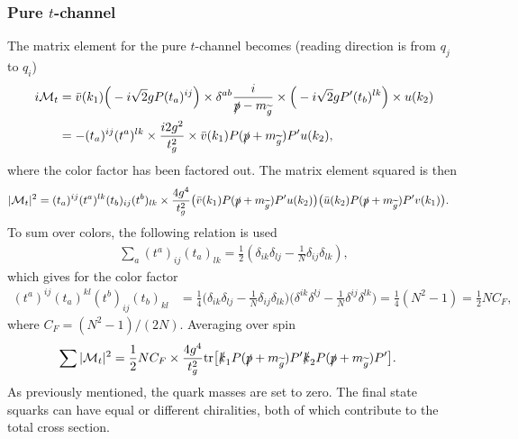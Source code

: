 \documentclass[twoside,english]{uiofysmaster}
\begin{document}
{\subsubsection{Pure $t$-channel}

The matrix element for the pure $t$-channel becomes (reading direction is from $q_j$ to $q_i$)
\begin{align*}
i \mathcal{M}_t &= \bar{v} (k_1) \Big( -i \sqrt{2} g P (t_a)^{ij}\Big) \times \delta^{ab} \frac{i}{\slashed{p} - m_{\widetilde{g}}} \times \Big( -i \sqrt{2} gP'(t_b)^{lk} \Big) \times u(k_2)\\
&= - (t_a)^{ij}(t^a)^{lk} \times \frac{i 2 g^2}{t_g^2} \times  \bar{v} (k_1)  P (\slashed{p} + m_{\widetilde{g}}) P' u(k_2) ,
\end{align*}
where the color factor has been factored out. The matrix element squared is then
\begin{align*}
|\mathcal{M}_t|^2 &=  (t_a)^{ij} (t^a)^{lk} (t_b)_{ij} (t^b)_{lk} \times \frac{4 g^4}{t_g^2}
\big( \bar{v} (k_1)  P (\slashed{p} + m_{\widetilde{g}}) P' u(k_2) \big)
\big( \bar{u} (k_2)  P (\slashed{p} + m_{\widetilde{g}}) P' v(k_1) \big).
\end{align*}
To sum over colors, the following relation is used \cite{ellis2003qcd}
\begin{align}
\sum_a (t^a)_{ij} (t_a)_{lk} = \frac{1}{2} (\delta_{ik} \delta_{lj} - \frac{1}{N} \delta_{ij} \delta_{lk}),
\end{align}
which gives for the color factor
\begin{align*}
(t^a)^{ij}(t_a)^{kl}(t^b)_{ij}(t_b)_{kl} &= \frac{1}{4} 
\big(\delta_{ik} \delta_{lj} - \frac{1}{N} \delta_{ij} \delta_{lk} \big)
\big(\delta^{ik} \delta^{lj} - \frac{1}{N} \delta^{ij} \delta^{lk} \big) = \frac{1}{4} (N^2 - 1) = \frac{1}{2}NC_F,
\end{align*}
where $C_F = (N^2 - 1)/(2N)$. Averaging over spin
\begin{align*}
\sum |\mathcal{M}_t|^2 &= \frac{1}{2} NC_F \times \frac{4 g^4}{t_g^2} \text{tr} \big[ 
\slashed{k}_1 P (\slashed{p} + m_{\widetilde{g}}) P' \slashed{k}_2 P (\slashed{p} + m_{\widetilde{g}}) P' \big].
\end{align*}
As previously mentioned, the quark masses are set to zero. The final state squarks can have equal or different chiralities, both of which contribute to the total cross section.

}
\end{document}
